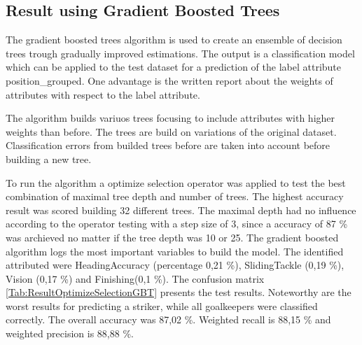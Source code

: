 \subsection{Result using Gradient Boosted Trees}

The gradient boosted trees algorithm is used to create an ensemble of decision trees trough gradually improved estimations. The output is a classification model which can be applied to the test dataset for a prediction of the label attribute position\_grouped. \newline
One advantage is the written report about the weights of attributes with respect to the label attribute.~\cite{ref_rapidminergbt}

The algorithm builds variuos trees focusing to include attributes with higher weights than before. The trees are build on variations of the original dataset. Classification errors from builded trees before are taken into account before building a new tree. ~\cite{ref_towardsGBT}

To run the algorithm a optimize selection operator was applied to test the best combination of maximal tree depth and number of trees. The highest accuracy result was scored building 32 different trees. The maximal depth had no influence according to the operator testing with a step size of 3, since a accuracy of 87 \% was archieved no matter if the tree depth was 10 or 25. \newline
The gradient boosted algorithm logs the most important variables to build the model. The identified attributed were HeadingAccuracy (percentage 0,21 \%), SlidingTackle (0,19 \%), Vision (0,17 \%) and Finishing(0,1 \%).
\newline
The confusion matrix \ref{Tab:ResultOptimizeSelectionGBT} presents the test results. Noteworthy are the worst results for predicting a striker, while all goalkeepers were classified correctly. The overall accuracy was 87,02 \%. Weighted recall is 88,15 \% and weighted precision is 88,88 \%. 

